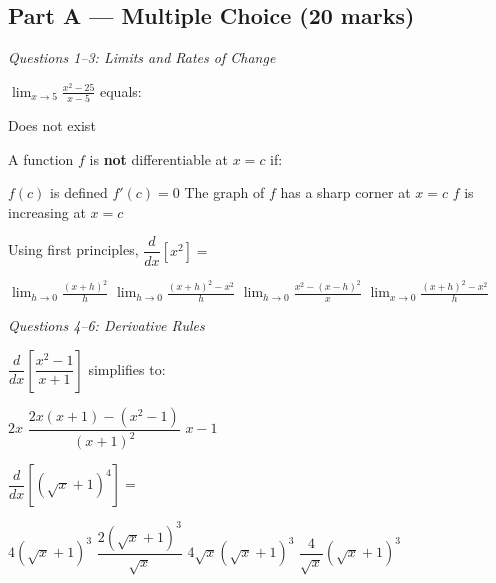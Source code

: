 \documentclass[addpoints]{exam}
\begin{document}
\newpage
\begin{questions}

\section*{Part A --- Multiple Choice (20 marks)}
\vspace{3mm}
\noindent\textit{Questions 1--3: Limits and Rates of Change}
\vspace{3mm}

\question[1] $\displaystyle\lim_{x \to 5} \frac{x^2 - 25}{x - 5}$ equals:
\begin{choices}
    \choice Does not exist
\end{choices}

\question[1] A function $f$ is \textbf{not} differentiable at $x = c$ if:
\begin{choices}
    \choice $f(c)$ is defined
    \choice $f'(c) = 0$
    \correctchoice The graph of $f$ has a sharp corner at $x = c$
    \choice $f$ is increasing at $x = c$
\end{choices}

\question[1] Using first principles, $\dfrac{d}{dx}\!\left[x^2\right] = $
\begin{choices}
    \choice $\displaystyle\lim_{h \to 0}\frac{(x+h)^2}{h}$
    \correctchoice $\displaystyle\lim_{h \to 0}\frac{(x+h)^2 - x^2}{h}$
    \choice $\displaystyle\lim_{h \to 0}\frac{x^2 - (x-h)^2}{x}$
    \choice $\displaystyle\lim_{x \to 0}\frac{(x+h)^2 - x^2}{h}$
\end{choices}

\vspace{3mm}
\noindent\textit{Questions 4--6: Derivative Rules}
\vspace{3mm}

\question[1] $\dfrac{d}{dx}\!\left[\dfrac{x^2-1}{x+1}\right]$ simplifies to:
\begin{choices}
    \choice $2x$
    \choice $\dfrac{2x(x+1)-(x^2-1)}{(x+1)^2}$
    \choice $x-1$
\end{choices}

\question[1] $\dfrac{d}{dx}\!\left[\left(\sqrt{x}+1\right)^4\right] = $
\begin{choices}
    \choice $4\left(\sqrt{x}+1\right)^3$
    \correctchoice $\dfrac{2\left(\sqrt{x}+1\right)^3}{\sqrt{x}}$
    \choice $4\sqrt{x}\left(\sqrt{x}+1\right)^3$
    \choice $\dfrac{4}{\sqrt{x}}\left(\sqrt{x}+1\right)^3$
\end{choices}


\end{questions}
\end{document}
